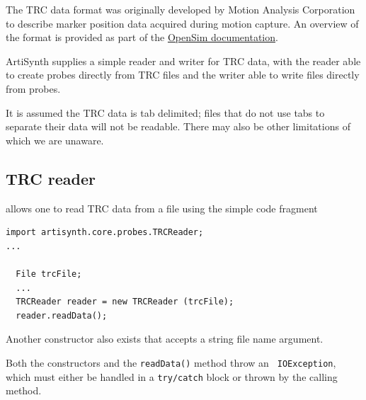 The TRC data format was originally developed by Motion Analysis Corporation to
describe marker position data acquired during motion capture. An overview of
the format is provided as part of the
\href{https://opensimconfluence.atlassian.net/wiki/spaces/OpenSim/pages/53089972/Marker+.trc+Files}{OpenSim
documentation}.

ArtiSynth supplies a simple reader and writer for TRC data, with the reader
able to create probes directly from TRC files and the writer able to write
files directly from probes.

\begin{sideblock}
It is assumed the TRC data is tab delimited; files that do not use tabs to
separate their data will not be readable. There may also be other limitations of
which we are unaware.
\end{sideblock}

\subsection{TRC reader}
\label{TRCReader:sec}

 allows one to read TRC data from a file using
the simple code fragment
%
\begin{lstlisting}[]
import artisynth.core.probes.TRCReader;
...

  File trcFile;
  ...
  TRCReader reader = new TRCReader (trcFile);
  reader.readData();
\end{lstlisting}
%
Another constructor also exists that accepts a string file name argument.

\begin{sideblock}
Both the constructors and the {\tt readData()} method throw an {\tt
IOException}, which must either be handled in a {\tt try/catch} block or thrown
by the calling method.
\end{sideblock}

